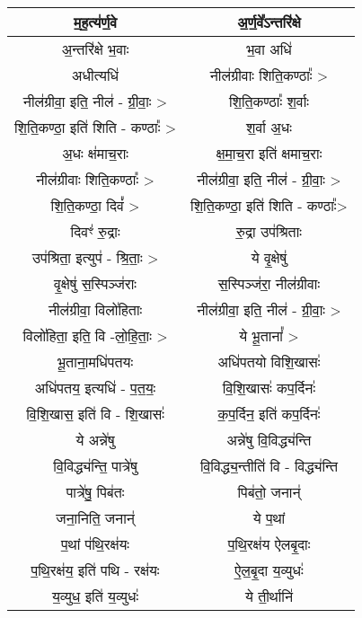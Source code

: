{\centering
\begin{longtable}{|c|c|}
\hline
म॒ह॒त्य॑र्ण॒वे                       & अ॒र्ण॒वे᳚ऽन्तरि॑क्षे\\
\hline
अ॒न्तरि॑क्षे भ॒वाः                  & भ॒वा अधि॑\\
\hline
अधीत्यधि॑                       & नील॑ग्रीवाः शिति॒कण्ठाः᳚ >\\
\hline
नील॑ग्रीवा॒ इति॒ नील॑ - ग्री॒वाः॒ >   & शि॒ति॒कण्ठाः᳚ श॒र्वाः\\
\hline
शि॒ति॒कण्ठा॒ इति॑ शिति - कण्ठाः᳚ >   & श॒र्वा अ॒धः\\
\hline
अ॒धः क्ष॑माच॒राः                  & क्ष॒मा॒च॒रा इति॑ क्षमाच॒राः\\
\hline
नील॑ग्रीवाः शिति॒कण्ठाः᳚ >         & नील॑ग्रीवा॒ इति॒ नील॑ - ग्री॒वाः॒ >\\
\hline
शि॒ति॒कण्ठा॒ दिवं᳚ >                & शि॒ति॒कण्ठा॒ इति॑ शिति - कण्ठाः᳚>\\
\hline
दिवꣳ॑ रु॒द्राः                    & रु॒द्रा उप॑श्रिताः\\
\hline
उप॑श्रिता॒ इत्युप॑ - श्रि॒ताः॒ >       & ये वृ॒क्षेषु॑\\
\hline
वृ॒क्षेषु॑ स॒स्पिञ्ज॑राः                & स॒स्पिञ्ज॑रा॒ नील॑ग्रीवाः\\
\hline
नील॑ग्रीवा॒ विलो॑हिताः            & नील॑ग्रीवा॒ इति॒ नील॑ - ग्री॒वाः॒ >\\
\hline
विलो॑हिता॒ इति॒ वि -लो॒हि॒ताः॒ >    & ये भू॒तानां᳚ >\\
\hline
भू॒ताना॒मधि॑पतयः                  & अधि॑पतयो विशि॒खासः॑\\
\hline
अधि॑पतय॒ इत्यधि॑ - प॒त॒यः॒           & वि॒शि॒खासः॑ कप॒र्दिनः॑\\
\hline
वि॒शि॒खास॒ इति॑ वि - शि॒खासः॑       & क॒प॒र्दिन॒ इति॑ कप॒र्दिनः॑\\
\hline
ये अन्ने॑षु                        & अन्ने॑षु वि॒विद्ध्य॑न्ति\\
\hline
वि॒विद्ध्य॑न्ति॒ पात्रे॑षु              & वि॒विद्ध्य॒न्तीति॑ वि - विद्ध्य॑न्ति\\
\hline
पात्रे॑षु॒ पिब॑तः                   & पिब॑तो॒ जनान्॑\\
\hline
जना॒निति॒ जनान्॑                  & ये प॒थां\\
\hline
प॒थां प॑थि॒रक्ष॑यः                  & प॒थि॒रक्ष॑य ऐलबृ॒दाः\\
\hline
प॒थि॒रक्ष॑य॒ इति॑ पथि - रक्ष॑यः       & ऐ॒ल॒बृ॒दा य॒व्युधः॑\\
\hline
य॒व्युध॒ इति॑ य॒व्युधः॑                & ये ती॒र्थानि॑\\
\hline

\end{longtable}}
